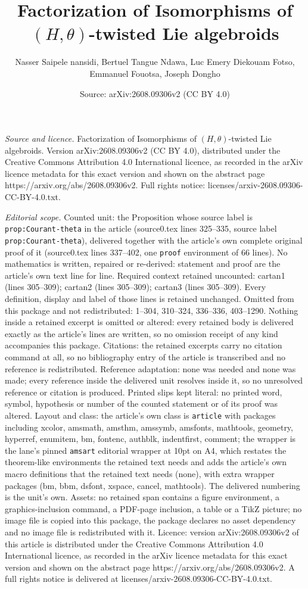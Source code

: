 \documentclass[10pt,a4paper]{amsart}
\title[Factorization of Isomorphisms of $(H,\theta)$-twisted Lie al]{Factorization of Isomorphisms of $(H,\theta)$-twisted Lie algebroids}
\author{Nasser Saipele nansidi, Bertuel Tangue Ndawa, Luc Emery Diekouam Fotso, Emmanuel Fouotsa, Joseph Dongho}
\date{Source: arXiv:2608.09306v2 (CC BY 4.0)}
\begin{document}
\maketitle

\noindent\emph{Source and licence.} Factorization of Isomorphisms of $(H,\theta)$-twisted Lie algebroids. Version arXiv:2608.09306v2 (CC BY 4.0), distributed under the Creative Commons Attribution 4.0 International licence, as recorded in the arXiv licence metadata for this exact version and shown on the abstract page https://arxiv.org/abs/2608.09306v2. Full rights notice: licenses/arxiv-2608.09306-CC-BY-4.0.txt.\par\smallskip

\noindent\textit{Editorial scope.} Counted unit: the Proposition whose source label is \texttt{prop:Courant-theta} in the article (source0.tex lines 325--335, source label \texttt{prop:Courant-theta}), delivered together with the article's own complete original proof of it (source0.tex lines 337--402, one \texttt{proof} environment of 66 lines). No mathematics is written, repaired or re-derived: statement and proof are the article's own text line for line. Required context retained uncounted: cartan1 (lines 305--309); cartan2 (lines 305--309); cartan3 (lines 305--309). Every definition, display and label of those lines is retained unchanged. Omitted from this package and not redistributed: 1--304, 310--324, 336--336, 403--1290. Nothing inside a retained excerpt is omitted or altered: every retained body is delivered exactly as the article's lines are written, so no omission receipt of any kind accompanies this package. Citations: the retained excerpts carry no citation command at all, so no bibliography entry of the article is transcribed and no reference is redistributed. Reference adaptation: none was needed and none was made; every reference inside the delivered unit resolves inside it, so no unresolved reference or citation is produced. Printed slips kept literal: no printed word, symbol, hypothesis or number of the counted statement or of its proof was altered. Layout and class: the article's own class is \texttt{article} with packages including xcolor, amsmath, amsthm, amssymb, amsfonts, mathtools, geometry, hyperref, enumitem, bm, fontenc, authblk, indentfirst, comment; the wrapper is the lane's pinned \texttt{amsart} editorial wrapper at 10pt on A4, which restates the theorem-like environments the retained text needs and adds the article's own macro definitions that the retained text needs (none), with extra wrapper packages (bm, bbm, dsfont, xspace, cancel, mathtools). The delivered numbering is the unit's own. Assets: no retained span contains a figure environment, a graphics-inclusion command, a PDF-page inclusion, a table or a TikZ picture; no image file is copied into this package, the package declares no asset dependency and no image file is redistributed with it. Licence: version arXiv:2608.09306v2 of this article is distributed under the Creative Commons Attribution 4.0 International licence, as recorded in the arXiv licence metadata for this exact version and shown on the abstract page https://arxiv.org/abs/2608.09306v2. A full rights notice is delivered at licenses/arxiv-2608.09306-CC-BY-4.0.txt. 
\end{document}
